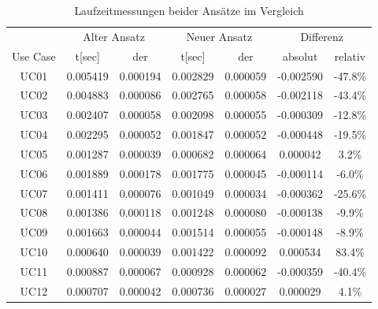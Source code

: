 \documentclass[%
			paper=a4,%
			DIV12,
			liststotoc,
			bibtotoc,
			draft=false,%
			titlepage,
			numbers=noendperiod
			]{scrartcl}
\begin{document}
\begin{table}[htpb]
	\begin{center}
	\begin{tabular}{|c|cc|cc|cc|}

		\hline
		& \multicolumn{2}{c|}{Alter Ansatz} & \multicolumn{2}{c|}{Neuer Ansatz} & \multicolumn{2}{c|}{Differenz}\\
		\multicolumn{1}{|c|}{Use Case} & t[sec] & der & t[sec] & der & absolut & relativ \\
		\hline

UC01 & 0.005419 & 0.000194 & 0.002829 & 0.000059 & -0.002590 & -47.8\%\\
UC02 & 0.004883 & 0.000086 & 0.002765 & 0.000058 & -0.002118 & -43.4\%\\
UC03 & 0.002407 & 0.000058 & 0.002098 & 0.000055 & -0.000309 & -12.8\%\\
UC04 & 0.002295 & 0.000052 & 0.001847 & 0.000052 & -0.000448 & -19.5\%\\
UC05 & 0.001287 & 0.000039 & 0.000682 & 0.000064 & 0.000042 & 3.2\%\\
UC06 & 0.001889 & 0.000178 & 0.001775 & 0.000045 & -0.000114 & -6.0\%\\
UC07 & 0.001411 & 0.000076 & 0.001049 & 0.000034 & -0.000362 & -25.6\%\\
UC08 & 0.001386 & 0.000118 & 0.001248 & 0.000080 & -0.000138 & -9.9\%\\
UC09 & 0.001663 & 0.000044 & 0.001514 & 0.000055 & -0.000148 & -8.9\%\\
UC10 & 0.000640 & 0.000039 & 0.001422 & 0.000092 & 0.000534 & 83.4\%\\
UC11 & 0.000887 & 0.000067 & 0.000928 & 0.000062 & -0.000359 & -40.4\%\\
UC12 & 0.000707 & 0.000042 & 0.000736 & 0.000027 & 0.000029 & 4.1\%\\

		\hline

	\end{tabular}
	\caption{Laufzeitmessungen beider Ansätze im Vergleich}
	\label{tab:usecases_results}
	\end{center}
\end{table}
\end{document}
